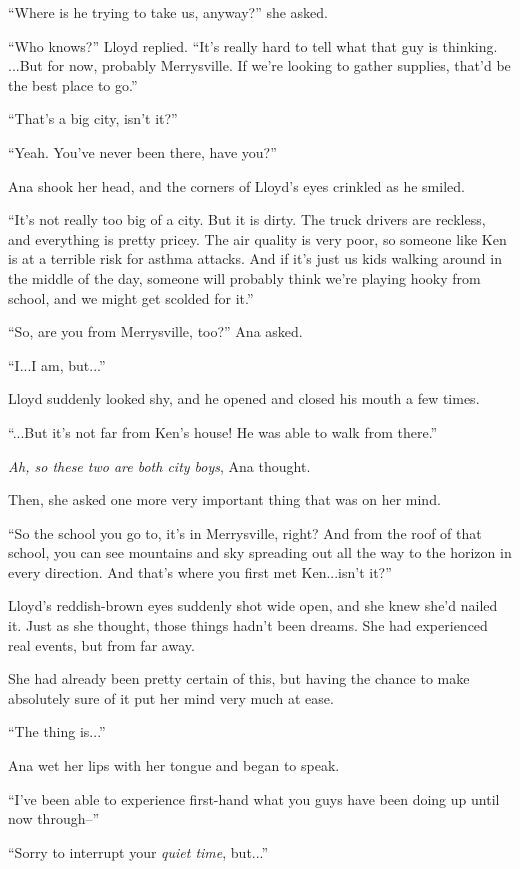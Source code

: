 \documentclass[
]{article}
\begin{document}
``Where is he trying to take us, anyway?'' she asked.

``Who knows?'' Lloyd replied. ``It's really hard to tell what that guy
is thinking. ...But for now, probably Merrysville. If we're looking to
gather supplies, that'd be the best place to go.''

``That's a big city, isn't it?''

``Yeah. You've never been there, have you?''

Ana shook her head, and the corners of Lloyd's eyes crinkled as he
smiled.

``It's not really too big of a city. But it is dirty. The truck drivers
are reckless, and everything is pretty pricey. The air quality is very
poor, so someone like Ken is at a terrible risk for asthma attacks. And
if it's just us kids walking around in the middle of the day, someone
will probably think we're playing hooky from school, and we might get
scolded for it.''

``So, are you from Merrysville, too?'' Ana asked.

``I...I am, but...''

Lloyd suddenly looked shy, and he opened and closed his mouth a few
times.

``...But it's not far from Ken's house! He was able to walk from
there.''

\emph{Ah, so these two are both city boys}, Ana thought.

Then, she asked one more very important thing that was on her mind.

``So the school you go to, it's in Merrysville, right? And from the roof
of that school, you can see mountains and sky spreading out all the way
to the horizon in every direction. And that's where you first met
Ken...isn't it?''

Lloyd's reddish-brown eyes suddenly shot wide open, and she knew she'd
nailed it. Just as she thought, those things hadn't been dreams. She had
experienced real events, but from far away.

She had already been pretty certain of this, but having the chance to
make absolutely sure of it put her mind very much at ease.

``The thing is...''

Ana wet her lips with her tongue and began to speak.

``I've been able to experience first-hand what you guys have been doing
up until now through--''

``Sorry to interrupt your \emph{quiet time}, but...''
\end{document}
